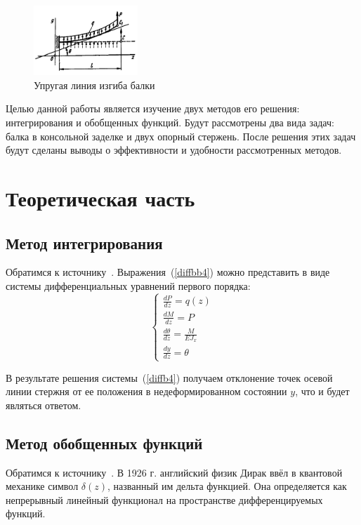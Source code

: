 \documentclass[12pt, a4paper]{article}
\begin{document}
\begin{figure}[!h]
	\centering
	\includegraphics[width=0.35\textwidth]{pic.6}%
	\caption{Упругая линия изгиба балки}
	\vspace*{-2mm}
	\label{pic6}
\end{figure}
\newpage
Целью данной работы является изучение двух методов его решения: интегрирования и обобщенных функций. Будут рассмотрены два вида задач: балка в консольной заделке и двух опорный стержень. После решения этих задач будут сделаны выводы о эффективности и удобности рассмотренных методов.

\section{Теоретическая часть}

\subsection{Метод интегрирования}
Обратимся к источнику~\cite{Feofociev}.
Выражения~(\ref{diffbb4}) можно представить в виде системы дифференциальных уравнений первого порядка:
\begin{equation}
	\label{diffb4}
	\begin{cases}
	\frac{d P}{d z} = q(z) \\
	\frac {d M}{d z} = P \\
	\frac{d \theta}{d z} = \frac{M}{E J_{x}}\\
	\frac{d y}{d z} = \theta 
	\end{cases}
\end{equation}

В результате решения системы~(\ref{diffb4}) получаем отклонение точек осевой линии стержня от ее положения в недеформированном состоянии $y$, что и будет являться ответом.

\subsection{Метод обобщенных функций}
Обратимся к источнику~\cite{Korneev}.
В 1926 г. английский физик Дирак ввёл в квантовой механике символ $\delta (z)$, названный им дельта функцией. Она определяется как непрерывный линейный функционал на пространстве дифференцируемых функций.
\end{document}
